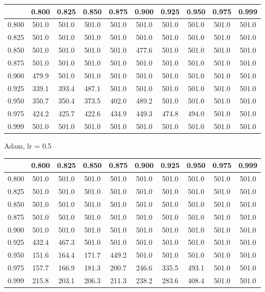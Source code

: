 \documentclass[a4paper,14pt,oneside,openany]{memoir}
\begin{document}
	\begin{tabular}{|c|c|c|c|c|c|c|c|c|c|}
	\hline 
	 &0.800 &0.825 &0.850 &0.875 &0.900 &0.925 &0.950 &0.975 &0.999 \\
	 \hline 
	0.800 &501.0 &501.0 &501.0 &501.0 &501.0 &501.0 &501.0 &501.0 &501.0 \\
	 \hline 
	0.825 &501.0 &501.0 &501.0 &501.0 &501.0 &501.0 &501.0 &501.0 &501.0 \\
	 \hline 
	0.850 &501.0 &501.0 &501.0 &501.0 &477.6 &501.0 &501.0 &501.0 &501.0 \\
	 \hline 
	0.875 &501.0 &501.0 &501.0 &501.0 &501.0 &501.0 &501.0 &501.0 &501.0 \\
	 \hline 
	0.900 &479.9 &501.0 &501.0 &501.0 &501.0 &501.0 &501.0 &501.0 &501.0 \\
	 \hline 
	0.925 &339.1 &393.4 &487.1 &501.0 &501.0 &501.0 &501.0 &501.0 &501.0 \\
	 \hline 
	0.950 &350.7 &350.4 &373.5 &402.0 &489.2 &501.0 &501.0 &501.0 &501.0 \\
	 \hline 
	0.975 &424.2 &425.7 &422.6 &434.9 &449.3 &474.8 &494.0 &501.0 &501.0 \\
	 \hline 
	0.999 &501.0 &501.0 &501.0 &501.0 &501.0 &501.0 &501.0 &501.0 &501.0 \\
	 \hline 
	
	\end{tabular}
	
	Adam, lr = 0.5 
	
	\begin{tabular}{|c|c|c|c|c|c|c|c|c|c|}
	\hline 
	 &0.800 &0.825 &0.850 &0.875 &0.900 &0.925 &0.950 &0.975 &0.999 \\
	 \hline 
	0.800 &501.0 &501.0 &501.0 &501.0 &501.0 &501.0 &501.0 &501.0 &501.0 \\
	 \hline 
	0.825 &501.0 &501.0 &501.0 &501.0 &501.0 &501.0 &501.0 &501.0 &501.0 \\
	 \hline 
	0.850 &501.0 &501.0 &501.0 &501.0 &501.0 &501.0 &501.0 &501.0 &501.0 \\
	 \hline 
	0.875 &501.0 &501.0 &501.0 &501.0 &501.0 &501.0 &501.0 &501.0 &501.0 \\
	 \hline 
	0.900 &501.0 &501.0 &501.0 &501.0 &501.0 &501.0 &501.0 &501.0 &501.0 \\
	 \hline 
	0.925 &432.4 &467.3 &501.0 &501.0 &501.0 &501.0 &501.0 &501.0 &501.0 \\
	 \hline 
	0.950 &151.6 &164.4 &171.7 &449.2 &501.0 &501.0 &501.0 &501.0 &501.0 \\
	 \hline 
	0.975 &157.7 &166.9 &181.3 &200.7 &246.6 &335.5 &493.1 &501.0 &501.0 \\
	 \hline 
	0.999 &215.8 &203.1 &206.3 &211.3 &238.2 &283.6 &408.4 &501.0 &501.0 \\
	 \hline 
	
	\end{tabular}
	
\end{document}
